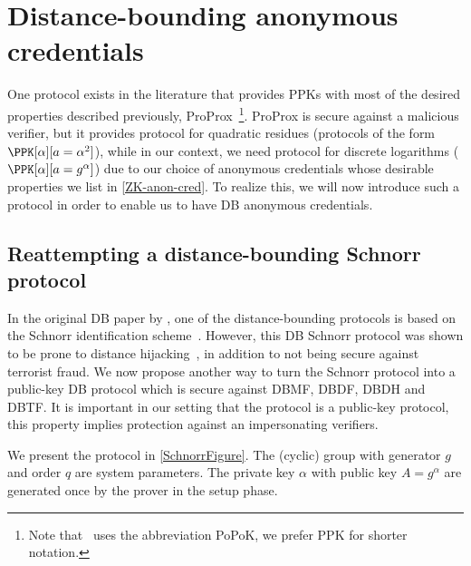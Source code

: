 \section{Distance-bounding anonymous credentials}%
\label{DB-anon-cred}

One protocol exists in the literature that provides \acp{PPK} with most of the 
desired properties described previously, ProProx~\cite{ProProx}\footnote{Note 
  that~\cite{ProProx} uses the abbreviation PoPoK, we prefer \acs{PPK} for 
  shorter notation.}.
ProProx is secure against a malicious verifier, but it provides  
protocol for quadratic residues (\ie protocols of the form \(\PPK[\alpha][a = 
  \alpha^2]\)), while in our context, we need  protocol for discrete 
logarithms (\ie \(\PPK[\alpha][a = g^\alpha]\)) due to our choice of 
anonymous credentials whose desirable properties we list in
\cref{ZK-anon-cred}.%
To realize this, we will now introduce such a protocol in order to enable us to have \ac{DB} anonymous credentials.

\subsection{Reattempting a distance-bounding Schnorr protocol}%
\label{DBSchnorr}


In the original \ac{DB} paper by \citet{DistanceBounding}, one of the 
distance-bounding protocols is based on the Schnorr identification 
scheme~\cite{Schnorr}.
However, this \ac{DB} Schnorr protocol was shown to be prone to distance hijacking~\cite{DistanceHijacking, TamarinDB}, in addition to not being secure against terrorist fraud.
We now propose another way to turn the Schnorr protocol into a
public-key \ac{DB} protocol which is secure against \ac{DBMF},
\ac{DBDF}, \ac{DBDH} and \ac{DBTF}.
It is important in our setting that the protocol is a public-key protocol, this 
property implies protection against an impersonating verifiers.

We present the protocol in \cref{SchnorrFigure}.
The (cyclic) group with generator \(g\) and order \(q\) are system parameters.
The private key \(\alpha\) with public key \(A = g^\alpha\) are generated once 
by the prover in the setup phase.


